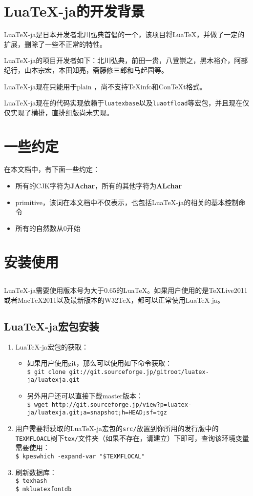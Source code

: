 \documentclass{ltjarticle}
\def\LuaTeX{Lua\TeX}
\def\pTeX{p\TeX}
\begin{document}
\section{\LuaTeX-ja的开发背景}
\LuaTeX-ja是日本开发者北川弘典首倡的一个，该项目将\LuaTeX，并做了一定的扩展，删除了一些不正常的特性。

\LuaTeX-ja的项目开发者如下：北川弘典，前田一贵，八登崇之，黑木裕介，阿部纪行，山本宗宏，本田知亮，斋藤修三郎和马起园等。

\LuaTeX-ja现在只能用于plain ，尚不支持\TeX info和Con\TeX t格式。

\LuaTeX-ja现在的代码实现依赖于\verb!luatexbase!以及\verb!luaotfload!等宏包，并且现在仅仅实现了横排，直排组版尚未实现。
\section{一些约定}
在本文档中，有下面一些约定：
\begin{itemize}
\item 所有的CJK字符为\textbf{JAchar}，所有的其他字符为\textbf{ALchar}
\item primitive，该词在本文档中不仅表示，也包括\LuaTeX-ja的相关的基本控制命令
\item 所有的自然数从0开始
\end{itemize}
\section{安装使用}
\subsection{}
\LuaTeX-ja需要使用版本号为大于0.65的\LuaTeX。如果用户使用的是\TeX Live2011或者Mac\TeX 2011以及最新版本的W32\TeX，都可以正常使用\LuaTeX-ja。
\subsection{\LuaTeX-ja宏包安装}
\begin{enumerate}
\item \LuaTeX-ja宏包的获取：
	\begin{itemize}
	\item 如果用户使用git，那么可以使用如下命令获取：\\
		\verb!$ git clone git://git.sourceforge.jp/gitroot/luatex-ja/luatexja.git!
	\item 另外用户还可以直接下载master版本：\\
		\verb!$ wget http://git.sourceforge.jp/view?p=luatex-ja/luatexja.git;a=snapshot;h=HEAD;sf=tgz!
	\end{itemize}
\item 用户需要将获取的\LuaTeX-ja宏包的\verb!src/!放置到你所用的发行版中的\verb!TEXMFLOACL!树下\verb!tex/!文件夹（如果不存在，请建立）下即可，查询该环境变量需要使用：\\
	\verb!$ kpeswhich -expand-var "$TEXMFLOCAL"!
\item 刷新数据库：\\
	\verb!$ texhash!\\
	\verb!$ mkluatexfontdb!
\end{enumerate}
\end{document}
